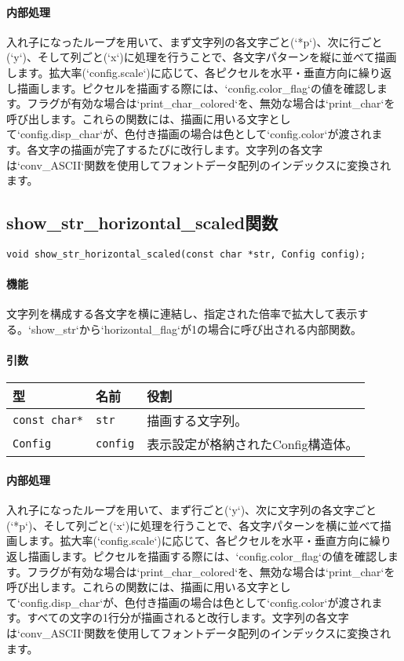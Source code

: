 \documentclass[uplatex]{jsarticle}
\begin{document}
\paragraph{内部処理}
入れ子になったループを用いて、まず文字列の各文字ごと(`*p`)、次に行ごと(`y`)、そして列ごと(`x`)に処理を行うことで、各文字パターンを縦に並べて描画します。拡大率(`config.scale`)に応じて、各ピクセルを水平・垂直方向に繰り返し描画します。ピクセルを描画する際には、`config.color\_flag`の値を確認します。フラグが有効な場合は`print\_char\_colored`を、無効な場合は`print\_char`を呼び出します。これらの関数には、描画に用いる文字として`config.disp\_char`が、色付き描画の場合は色として`config.color`が渡されます。各文字の描画が完了するたびに改行します。文字列の各文字は`conv\_ASCII`関数を使用してフォントデータ配列のインデックスに変換されます。

\subsection{show\_str\_horizontal\_scaled関数}
\texttt{void show\_str\_horizontal\_scaled(const char *str, Config config);}
\paragraph{機能}
文字列を構成する各文字を横に連結し、指定された倍率で拡大して表示する。`show\_str`から`horizontal\_flag`が1の場合に呼び出される内部関数。

\paragraph{引数}
\begin{center}
    \begin{tabular}{|l|l|p{7.5cm}|}
        \hline
        \textbf{型} & \textbf{名前} & \textbf{役割} \\ \hline
        \texttt{const char*} & \texttt{str} & 描画する文字列。 \\ \hline
        \texttt{Config} & \texttt{config} & 表示設定が格納されたConfig構造体。 \\ \hline
    \end{tabular}
\end{center}

\paragraph{内部処理}
入れ子になったループを用いて、まず行ごと(`y`)、次に文字列の各文字ごと(`*p`)、そして列ごと(`x`)に処理を行うことで、各文字パターンを横に並べて描画します。拡大率(`config.scale`)に応じて、各ピクセルを水平・垂直方向に繰り返し描画します。ピクセルを描画する際には、`config.color\_flag`の値を確認します。フラグが有効な場合は`print\_char\_colored`を、無効な場合は`print\_char`を呼び出します。これらの関数には、描画に用いる文字として`config.disp\_char`が、色付き描画の場合は色として`config.color`が渡されます。すべての文字の1行分が描画されると改行します。文字列の各文字は`conv\_ASCII`関数を使用してフォントデータ配列のインデックスに変換されます。
\end{document}
